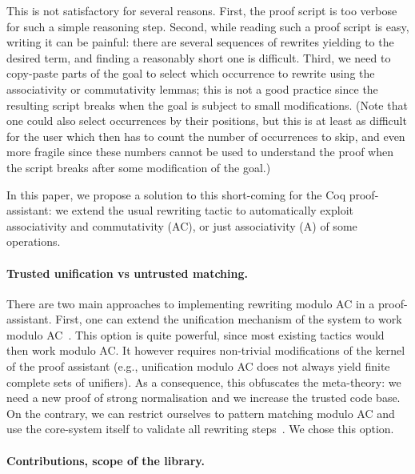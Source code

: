 \documentclass{llncs}
\begin{document}
\noindent
This is not satisfactory for several reasons. First, the proof script
is too verbose for such a simple reasoning step. Second, while reading
such a proof script is easy, writing it can be painful: there are
several sequences of rewrites yielding to the desired term, and
finding a reasonably short one is difficult. Third, we need to
copy-paste parts of the goal to select which occurrence to rewrite
using the associativity or commutativity lemmas; this is not a good
practice since the resulting script breaks when the goal is subject to
small modifications. (Note that one could also select occurrences by
their positions, but this is at least as difficult for the user which
then has to count the number of occurrences to skip, and even more
fragile since these numbers cannot be used to understand the proof
when the script breaks after some modification of the goal.)

In this paper, we propose a solution to this short-coming for the Coq
proof-assistant: we extend the usual rewriting tactic to automatically
exploit associativity and commutativity (AC), or just associativity
(A) of some operations.


\paragraph{Trusted unification vs untrusted matching.}

There are two main approaches to implementing rewriting modulo AC in a
proof-assistant.
First, one can extend the unification mechanism of the system to work
modulo AC~\cite{Pl72}. This option is quite powerful, since most
existing tactics would then work modulo AC. It however requires
non-trivial modifications of the kernel of the proof assistant (e.g.,
unification modulo AC does not always yield finite complete sets of
unifiers). As a consequence, this obfuscates the meta-theory: we need
a new proof of strong normalisation and we increase the trusted code
base.
On the contrary, we can restrict ourselves to pattern matching modulo
AC and use the core-system itself to validate all rewriting
steps~\cite{BoyerMoore81}. We chose this option.

\paragraph{Contributions, scope of the library.}
\end{document}
